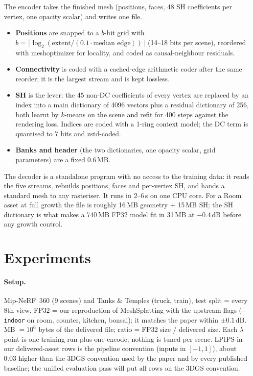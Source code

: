 \documentclass[11pt,a4paper]{article}
\begin{document}
The encoder takes the finished mesh (positions, faces, 48 SH coefficients per vertex, one opacity scalar) and writes one file.
\begin{itemize}[nosep,leftmargin=*]
  \item \textbf{Positions} are snapped to a $b$-bit grid with $b = \lceil \log_2(\text{extent} / (0.1\cdot\text{median edge})) \rceil$ (14--18 bits per scene), reordered with meshoptimizer for locality, and coded as causal-neighbour residuals.
  \item \textbf{Connectivity} is coded with a cached-edge arithmetic coder after the same reorder; it is the largest stream and is kept lossless.
  \item \textbf{SH} is the lever: the 45 non-DC coefficients of every vertex are replaced by an index into a main dictionary of 4096 vectors plus a residual dictionary of 256, both learnt by $k$-means on the scene and refit for 400 steps against the rendering loss. Indices are coded with a 1-ring context model; the DC term is quantised to 7 bits and zstd-coded.
  \item \textbf{Banks and header} (the two dictionaries, one opacity scalar, grid parameters) are a fixed 0.6\,MB.
\end{itemize}
The decoder is a standalone program with no access to the training data: it reads the five streams, rebuilds positions, faces and per-vertex SH, and hands a standard mesh to any rasteriser. It runs in 2--6\,s on one CPU core. For a Room asset at full growth the file is roughly 16\,MB geometry + 15\,MB SH; the SH dictionary is what makes a 740\,MB FP32 model fit in 31\,MB at $-0.4$\,dB before any growth control.

\section{Experiments}
\label{sec:exp}

\paragraph{Setup.} Mip-NeRF~360 (9 scenes) and Tanks \& Temples (truck, train), test split = every 8th view. FP32 = our reproduction of MeshSplatting with the upstream flags (\texttt{--indoor} on room, counter, kitchen, bonsai); it matches the paper within $\pm 0.1$\,dB. MB $= 10^6$ bytes of the delivered file; ratio = FP32 size / delivered size. Each $\lambda$ point is one training run plus one encode; nothing is tuned per scene. LPIPS in our delivered-asset rows is the pipeline convention (inputs in $[-1,1]$), about 0.03 higher than the 3DGS convention used by the paper and by every published baseline; the unified evaluation pass will put all rows on the 3DGS convention.
\end{document}
